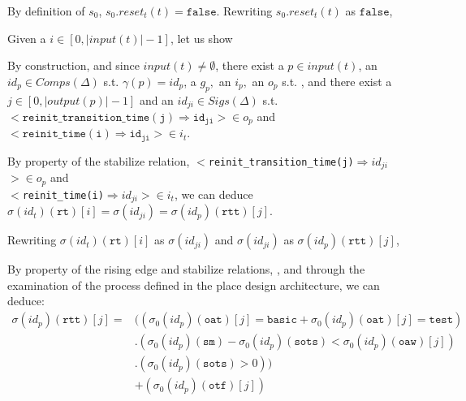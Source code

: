 \documentclass[dvipsnames,12pt]{article}
\begin{document}
\begin{niproof}
\begin{itemize}
    By definition of $s_0$, $s_0.reset_t(t)=\mathtt{false}$. Rewriting
    $s_0.reset_t(t)$ as $\mathtt{false}$,\\

    Given a $i\in[0,\vert{}input(t)\vert-1]$, let us show
    
    By construction, and since $input(t)\neq{}\emptyset$, there exist
    a $p\in{}input(t)$, an $id_p\in{}Comps(\Delta)$
    s.t. $\gamma(p)=id_p$, a $g_p,$ an $i_p,$ an $o_p$
    s.t. \InCsCompP{}, and there exist a
    $j\in[0,\vert{}output(p)\vert-1]$ and an
    $id_{ji}\in{}Sigs(\Delta)$ s.t.
    ${<}\mathtt{reinit\_transition\_time(j)\Rightarrow{}id_{ji}}{>}\in{}o_p$
    and
    ${<}\mathtt{reinit\_time(i)\Rightarrow{}id_{ji}}{>}\in{}i_t$.

    By property of the stabilize relation,
    ${<}$\texttt{reinit\_transition\_time(j)$\Rightarrow{}id_{ji}$}${>}\in{}o_p$
    and\\
    ${<}$\texttt{reinit\_time(i)$\Rightarrow{}id_{ji}$}${>}\in{}i_t$,
    we can deduce
    $\sigma(id_t)(\texttt{rt})[i]=\sigma(id_{ji})=\sigma(id_p)(\texttt{rtt})[j]$.

    Rewriting $\sigma(id_t)(\texttt{rt})[i]$ as $\sigma(id_{ji})$ and
    $\sigma(id_{ji})$ as $\sigma(id_p)(\texttt{rtt})[j]$,

    By property of the \hvhdl{} rising edge and stabilize relations,
    \InCsCompP{}, and through the examination of the process defined
    in the place design architecture, we can deduce:
    \begin{equation}
      \label{eq:rtt-at-init}
      \begin{split}
        \sigma(id_p)(\texttt{rtt})[j]=& ((\sigma_0(id_p)(\texttt{oat})[j]=\mathtt{basic}+\sigma_0(id_p)(\texttt{oat})[j]=\mathtt{test}) \\
        & .(\sigma_0(id_p)(\texttt{sm})-\sigma_0(id_p)(\texttt{sots})<\sigma_0(id_p)(\texttt{oaw})[j])\\
        & .(\sigma_0(id_p)(\texttt{sots})>0))\\
        & +(\sigma_0(id_p)(\texttt{otf})[j]) \\
      \end{split}
    \end{equation}


\end{itemize}
\end{niproof}
\end{document}
